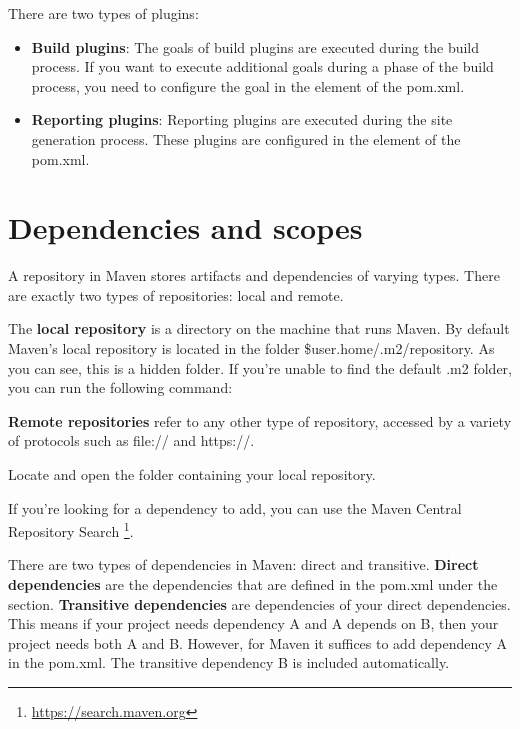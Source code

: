 There are two types of plugins:
\begin{itemize}
\item \textbf{Build plugins}: The goals of build plugins are executed during the build process.  If you want to execute additional goals during a phase of the build process, you need to configure the goal in the  element of the pom.xml.
\item \textbf{Reporting plugins}: Reporting plugins are executed during the site generation process. These plugins are configured in the  element of the pom.xml.
\end{itemize}

\section{Dependencies and scopes}

A repository in Maven stores artifacts and dependencies of varying types. There are exactly two types of repositories: local and remote.

The \textbf{local repository} is a directory on the machine that runs Maven.  By default  Maven's local repository is located in the folder \${user.home}/.m2/repository. As you can see, this is a hidden folder.  If you're unable to find the default .m2 folder, you can run the following command:

\textbf{Remote repositories} refer to any other type of repository, accessed by a variety of protocols such as file:// and https://. 

\begin{oefening}
Locate and open the folder containing your local repository. 
\end{oefening}

If you're looking for a dependency to add, you can use the Maven Central Repository Search \footnote{\url{https://search.maven.org}}. 

There are two types of dependencies in Maven: direct and transitive. \textbf{Direct dependencies} are the dependencies that are defined in the pom.xml under the  section.  \textbf{Transitive dependencies} are dependencies of your direct dependencies.  This means if your project needs dependency A and A depends on B, then your project needs both A and B. However, for Maven it suffices to add dependency A in the pom.xml. The transitive dependency B is included automatically.

